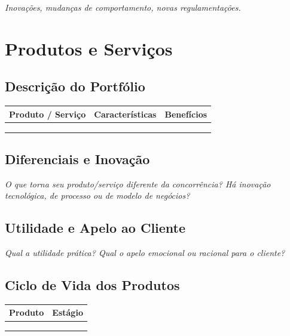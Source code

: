 \documentclass[
	12pt,
	openright,
	oneside,
	a4paper,
	chapter=TITLE,
	section=TITLE,
	english,
	brazil
	]{abntex2}
\newcommand{\tcampo}[1]{%
	{#1}%
}
\newcommand{\instrucao}[1]{%
	\vspace{0.3cm}%
	\noindent%
	{%
		\setlength{\fboxsep}{6pt}%
		\colorbox{azul-claro}{%
			\begin{minipage}{\dimexpr\textwidth-2\fboxsep\relax}%
				\setlength{\parindent}{1.25cm}%
				{\color{cinza-instrucao}\small\itshape #1}%
			\end{minipage}%
		}%
	}%
	\vspace{0.3cm}%
}
\begin{document}
\instrucao{Inovações, mudanças de comportamento, novas regulamentações.}

\clearpage

\chapter{Produtos e Serviços}

\section{Descrição do Portfólio}

\centering
\begin{tabularx}{\textwidth}{X X X}
\toprule
\rowcolor{azul-claro}
\textbf{Produto / Serviço} & \textbf{Características} & \textbf{Benefícios} \\
\midrule
\tcampo{} & \tcampo{} & \tcampo{} \\
\tcampo{} & \tcampo{} & \tcampo{} \\
\tcampo{} & \tcampo{} & \tcampo{} \\
\bottomrule
\end{tabularx}
\label{tab:portfolio}

\section{Diferenciais e Inovação}

\instrucao{O que torna seu produto/serviço diferente da concorrência? Há inovação tecnológica, de processo ou de modelo de negócios?}

\section{Utilidade e Apelo ao Cliente}

\instrucao{Qual a utilidade prática? Qual o apelo emocional ou racional para o cliente?}

\section{Ciclo de Vida dos Produtos}

\centering
\begin{tabularx}{\textwidth}{X c}
\toprule
\rowcolor{azul-claro}
\textbf{Produto} & \textbf{Estágio} \\
\midrule
\tcampo{} & \tcampo{} \\
\tcampo{} & \tcampo{} \\
\tcampo{} & \tcampo{} \\
\bottomrule
\end{tabularx}
\end{document}
